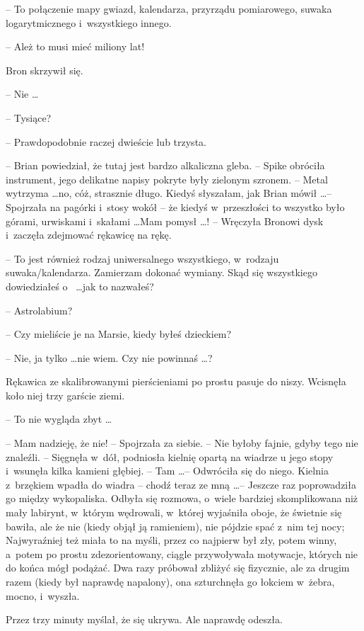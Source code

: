 \documentclass[oneside,polish,11pt,rmheadings]{mwbk}
\begin{document}
-- To połączenie mapy gwiazd, kalendarza, przyrządu pomiarowego, suwaka logarytmicznego i~wszystkiego innego. 

-- Ależ to musi mieć miliony lat! 

Bron skrzywił się. 

-- Nie  \ldots   

-- Tysiące? 

-- Prawdopodobnie raczej dwieście lub trzysta. 

-- Brian powiedział, że tutaj jest bardzo alkaliczna gleba. -- Spike obróciła instrument, jego delikatne napisy pokryte były zielonym szronem. -- Metal wytrzyma \ldots  no, cóż, strasznie długo. Kiedyś słyszałam, jak Brian mówił \ldots  -- Spojrzała na pagórki i~stosy wokół -- że kiedyś w~przeszłości to wszystko było górami, urwiskami i~skałami \ldots   Mam pomysł \ldots ! -- Wręczyła Bronowi dysk i~zaczęła zdejmować rękawicę na rękę. 

-- To jest również rodzaj uniwersalnego wszystkiego, w~rodzaju suwaka/kalendarza. Zamierzam dokonać wymiany. Skąd się wszystkiego dowiedziałeś o~ \ldots  jak to nazwałeś? 

-- Astrolabium?  

-- Czy mieliście je na Marsie, kiedy byłeś dzieckiem? 

-- Nie, ja tylko \ldots  nie wiem. Czy nie powinnaś \ldots ? 

Rękawica ze skalibrowanymi pierścieniami po prostu pasuje do niszy. Wcisnęła koło niej trzy garście ziemi. 

-- To nie wygląda zbyt \ldots  

-- Mam nadzieję, że nie! -- Spojrzała za siebie. -- Nie byłoby fajnie, gdyby tego nie znaleźli. -- Sięgnęła w~dół, podniosła kielnię opartą na wiadrze u jego stopy i~wsunęła kilka kamieni głębiej. -- Tam \ldots  -- Odwróciła się do niego. Kielnia z~brzękiem wpadła do wiadra -- chodź teraz ze mną \ldots  --  Jeszcze raz poprowadziła go między wykopaliska. Odbyła się rozmowa, o~wiele bardziej skomplikowana niż mały labirynt, w~którym wędrowali, w~której wyjaśniła oboje, że świetnie się bawiła, ale że nie (kiedy objął ją ramieniem), nie pójdzie spać z~nim tej nocy; Najwyraźniej też miała to na myśli, przez co najpierw był zły, potem winny, a~potem po prostu zdezorientowany, ciągle przywoływała motywacje, których nie do końca mógł podążać. Dwa razy próbował zbliżyć się fizycznie, ale za drugim razem (kiedy był naprawdę napalony), ona szturchnęła go łokciem w~żebra, mocno, i~wyszła. 

Przez trzy minuty myślał, że się ukrywa. Ale naprawdę odeszła. 
\end{document}
